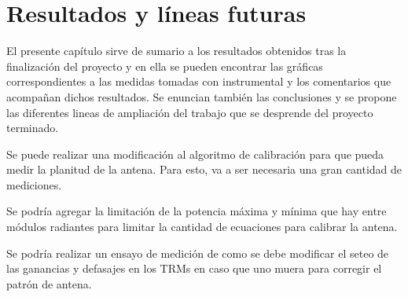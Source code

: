 \chapter{Resultados y líneas futuras}



El presente capítulo sirve de sumario a los resultados obtenidos tras la finalización del proyecto y en ella se pueden encontrar
las gráficas correspondientes a las medidas tomadas con instrumental y los comentarios que acompañan dichos resultados. Se enuncian
también las conclusiones y se propone las diferentes lineas de ampliación del trabajo que se desprende del proyecto terminado.

Se puede realizar una modificación al algoritmo de calibración para que pueda medir la planitud de la antena. Para esto, va a ser
necesaria una gran cantidad de mediciones.

Se podría agregar la limitación de la potencia máxima y mínima que hay entre módulos radiantes para limitar la cantidad de 
ecuaciones para calibrar la antena.

Se podría realizar un ensayo de medición de como se debe modificar el seteo de las ganancias y defasajes en los TRMs en caso 
que uno muera para corregir el patrón de antena.
